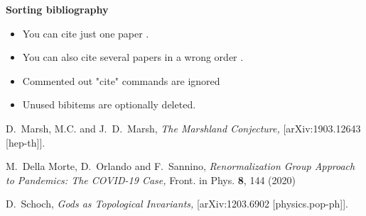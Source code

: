 \documentclass{article}
\begin{document}
\begin{center}
	\Large \bf Sorting bibliography
\end{center}

\begin{itemize}
\item You can cite just one paper \cite{Marsh:2019lhu}.
\item You can also cite several papers in a wrong order \cite{Marsh:2019lhu,DellaMorte:2020wlc,Schoch:2012xh}.
\item Commented out "cite" commands are ignored %
\item Unused bibitems are optionally deleted.
\end{itemize}





\begin{thebibliography}{99}





D.~Marsh, M.C. and J.~D.~Marsh,
{\em The Marshland Conjecture,}
[arXiv:1903.12643 [hep-th]].



M.~Della Morte, D.~Orlando and F.~Sannino,
{\em Renormalization Group Approach to Pandemics: The COVID-19 Case,}
Front. in Phys. \textbf{8}, 144 (2020)


D.~Schoch,
{\em Gods as Topological Invariants,}
[arXiv:1203.6902 [physics.pop-ph]].


\end{thebibliography}
\end{document}
